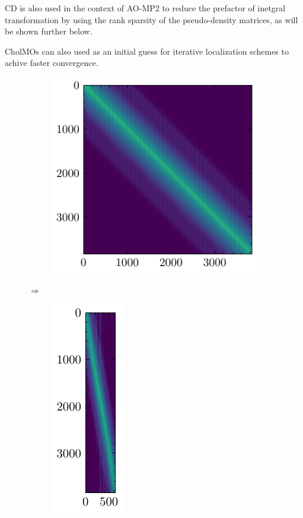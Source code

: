 CD is also used in the context of AO-MP2 to reduce the prefactor of inetgral transformation by using the rank sparsity of the pseudo-density matrices, as will be shown further below.

CholMOs can also used as an initial guess for iterative localization schemes to achive faster convergence.

\begin{figure}[h]
\centering
\begin{subfigure}{0.5\linewidth}
\centering
\includegraphics[scale=1.0]{densityO}
\end{subfigure}
$\Longrightarrow$
\begin{subfigure}{0.4\linewidth}
\centering
\includegraphics[scale=1.0]{choleskyO}
\end{subfigure}%
\hfill
\centering
\begin{subfigure}{0.5\linewidth}

\end{subfigure}
\end{figure}
